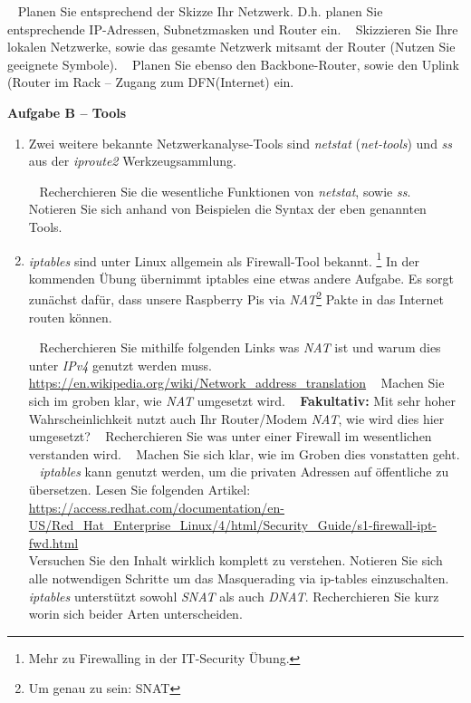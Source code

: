 \documentclass[paper=a4,fontsize=11pt]{scrartcl}%
\numberwithin{equation}{section}
\begin{document}
\begin{tasks}
		\task~ Planen Sie entsprechend der Skizze Ihr Netzwerk. D.h. planen Sie entsprechende IP-Adressen, Subnetzmasken und Router ein.
		\task~ Skizzieren Sie Ihre lokalen Netzwerke, sowie das gesamte Netzwerk mitsamt der Router (Nutzen Sie geeignete Symbole).
		\task~ Planen Sie ebenso den Backbone-Router, sowie den Uplink (Router im Rack -- Zugang zum DFN(Internet) ein.
	\end{tasks}
	
\begin{center}\Large{\textbf{Aufgabe B -- Tools}}\end{center}\vskip0.25in
\begin{enumerate}
	\item Zwei weitere bekannte Netzwerkanalyse-Tools sind \emph{netstat} (\emph{net-tools}) und \emph{ss} aus der \emph{iproute2} Werkzeugsammlung.
\begin{tasks}
		\task~ Recherchieren Sie die wesentliche Funktionen von \emph{netstat}, sowie \emph{ss}.
		\task~ Notieren Sie sich anhand von Beispielen die Syntax der eben genannten Tools. 
	\end{tasks}
	\item \emph{iptables} sind unter Linux allgemein als Firewall-Tool bekannt. \footnote{Mehr zu Firewalling in der IT-Security Übung.} In der kommenden Übung übernimmt iptables eine etwas andere Aufgabe. Es sorgt zunächst dafür, dass unsere Raspberry Pis via \emph{NAT}\footnote{Um genau zu sein: SNAT} Pakte in das Internet routen können.
	\begin{tasks}
		\task~ Recherchieren Sie mithilfe folgenden Links was \emph{NAT} ist und warum dies unter \emph{IPv4} genutzt werden muss. \\
		\url{https://en.wikipedia.org/wiki/Network_address_translation}
		\task~ Machen Sie sich im groben klar, wie \emph{NAT} umgesetzt wird. 
		\task~ \textbf{Fakultativ:} Mit sehr hoher Wahrscheinlichkeit nutzt auch Ihr Router/Modem \emph{NAT}, wie wird dies hier umgesetzt?
		\task~ Recherchieren Sie was unter einer Firewall im wesentlichen verstanden wird.
		\task~ Machen Sie sich klar, wie im Groben dies vonstatten geht.
		\task~ \emph{iptables} kann genutzt werden, um die privaten Adressen auf öffentliche zu übersetzen. Lesen Sie folgenden Artikel:\\
		\url{https://access.redhat.com/documentation/en-US/Red_Hat_Enterprise_Linux/4/html/Security_Guide/s1-firewall-ipt-fwd.html}\\
		Versuchen Sie den Inhalt wirklich komplett zu verstehen. Notieren Sie sich alle notwendigen Schritte um das Masquerading via ip-tables einzuschalten. 
		\task~ \emph{iptables} unterstützt sowohl \emph{SNAT} als auch \emph{DNAT}. Recherchieren Sie kurz worin sich beider Arten unterscheiden.
	\end{tasks}
\end{enumerate}
\end{document}
